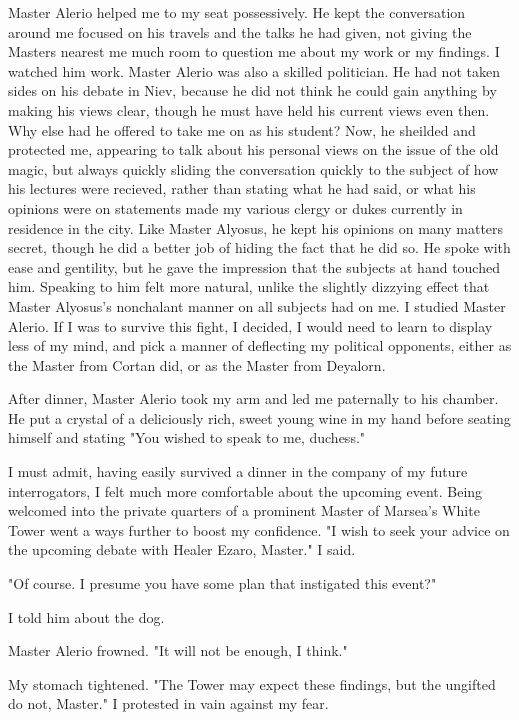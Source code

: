 \documentclass{article}
\begin{document}
Master Alerio helped me to my seat possessively. He kept the conversation around me focused on his travels and the talks he had given, not giving the Masters nearest me much room to question me about my work or my findings. I watched him work. Master Alerio was also a skilled politician. He had not taken sides on his debate in Niev, because he did not think he could gain anything by making his views clear, though he must have held his current views even then. Why else had he offered to take me on as his student? Now, he sheilded and protected me, appearing to talk about his personal views on the issue of the old magic, but always quickly sliding the conversation quickly to the subject of how his lectures were recieved, rather than stating what he had said, or what his opinions were on statements made my various clergy or dukes currently in residence in the city. Like Master Alyosus, he kept his opinions on many matters secret, though he did a better job of hiding the fact that he did so. He spoke with ease and gentility, but he gave the impression that the subjects at hand touched him. Speaking to him felt more natural, unlike the slightly dizzying effect that Master Alyosus's nonchalant manner on all subjects had on me. I studied Master Alerio. If I was to survive this fight, I decided, I would need to learn to display less of my mind, and pick a manner of deflecting my political opponents, either as the Master from Cortan did, or as the Master from Deyalorn.

After dinner, Master Alerio took my arm and led me paternally to his chamber. He put a crystal of a deliciously rich, sweet young wine in my hand before seating himself and stating "You wished to speak to me, duchess." 

I must admit, having easily survived a dinner in the company of my future interrogators, I felt much more comfortable about the upcoming event. Being welcomed into the private quarters of a prominent Master of Marsea's White Tower went a ways further to boost my confidence. "I wish to seek your advice on the upcoming debate with Healer Ezaro, Master." I said.

"Of course. I presume you have some plan that instigated this event?"

I told him about the dog.

Master Alerio frowned. "It will not be enough, I think." 

My stomach tightened. "The Tower may expect these findings, but the ungifted do not, Master." I protested in vain against my fear.
\end{document}

